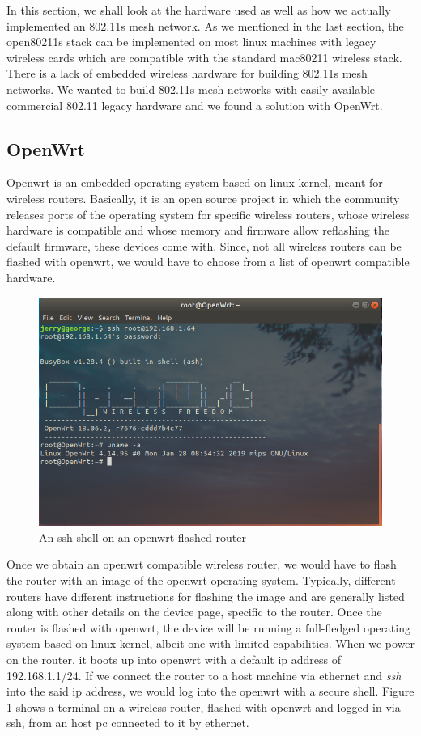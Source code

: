 In this section, we shall look at the hardware used as well as how we actually implemented an 802.11s mesh network. As we mentioned in the last section, the open80211s stack can be implemented on most linux machines with legacy wireless cards which are compatible with the standard mac80211 wireless stack. There is a lack of embedded wireless hardware for building 802.11s mesh networks. We wanted to build 802.11s mesh networks with easily available commercial 802.11 legacy hardware and we found a solution with OpenWrt.

\subsection{OpenWrt}
Openwrt \cite{ref1} is an embedded operating system based on linux kernel, meant for wireless routers. Basically, it is an open source project in which the community releases ports of the operating system for specific wireless routers, whose wireless hardware is compatible and whose memory and firmware allow reflashing the default firmware, these devices come with. Since, not all wireless routers can be flashed with openwrt, we would have to choose from a list of openwrt compatible hardware.

\begin{figure}[h]
	\centering
	\includegraphics[scale=0.6]{Pictures/ssh4.png}
	\caption{An ssh shell on an openwrt flashed router}
	\label{fig: openwrt-shell}
\end{figure}

Once we obtain an openwrt compatible wireless router, we would have to flash the router with an image of the openwrt operating system. Typically, different routers have different instructions for flashing the image and are generally listed along with other details on the device page, specific to the router. Once the router is flashed with openwrt, the device will be running a full-fledged operating system based on linux kernel, albeit one with limited capabilities. When we power on the router, it boots up into openwrt with a default ip address of 192.168.1.1/24. If we connect the router to a host machine via ethernet and \textit{ssh} into the said ip address, we would log into the openwrt with a secure shell. Figure \ref{fig: openwrt-shell} shows a terminal on a wireless router, flashed with openwrt and logged in via ssh, from an host pc connected to it by ethernet.

